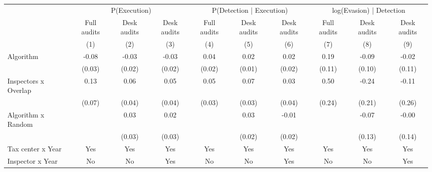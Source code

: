 \begin{tabular}{lccc|ccc|ccc} \toprule
\multicolumn{1}{l}{} & \multicolumn{3}{c}{P(Execution)} & \multicolumn{3}{c}{P(Detection | Execution)} & \multicolumn{3}{c}{log(Evasion) | Detection} \\\cmidrule(lr){2-4}\cmidrule(lr){5-7}\cmidrule(lr){8-10} \multicolumn{1}{l}{} & Full audits & Desk audits & Desk audits & Full audits & Desk audits & Desk audits & Full audits & Desk audits & Desk audits \\ \multicolumn{1}{l}{} & (1) & (2) & (3) & (4) & (5) & (6) & (7) & (8) & (9) \\ \midrule
Algorithm   &       -0.08\sym{**} &       -0.03\sym{*}  &       -0.03\sym{*}  &        0.04\sym{**} &        0.02         &        0.02         &        0.19\sym{*}  &       -0.09         &       -0.02         \\
            &      (0.03)         &      (0.02)         &      (0.02)         &      (0.02)         &      (0.01)         &      (0.02)         &      (0.11)         &      (0.10)         &      (0.11)         \\
\addlinespace
Inspectors x Overlap&        0.13\sym{**} &        0.06         &        0.05         &        0.05\sym{*}  &        0.07\sym{**} &        0.03         &        0.50\sym{**} &       -0.24         &       -0.11         \\
            &      (0.07)         &      (0.04)         &      (0.04)         &      (0.03)         &      (0.03)         &      (0.04)         &      (0.24)         &      (0.21)         &      (0.26)         \\
\addlinespace
Algorithm x Random&                     &        0.03         &        0.02         &                     &        0.03         &       -0.01         &                     &       -0.07         &       -0.00         \\
            &                     &      (0.03)         &      (0.03)         &                     &      (0.02)         &      (0.02)         &                     &      (0.13)         &      (0.14)         \\
\midrule
Tax center x Year&         Yes         &         Yes         &         Yes         &         Yes         &         Yes         &         Yes         &         Yes         &         Yes         &         Yes         \\
Inspector x Year&          No         &          No         &         Yes         &          No         &          No         &         Yes         &          No         &          No         &         Yes         \\

\end{tabular}
